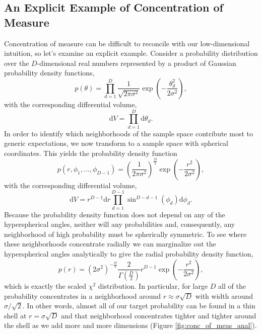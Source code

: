 \documentclass[11pt, oneside]{article}
\newcommand{\dd}{ \mathrm{d} }
\begin{document}
\subsection{An Explicit Example of Concentration of Measure}

Concentration of measure can be difficult to reconcile with our
low-dimensional intuition, so let's examine an explicit example.  Consider 
a probability distribution over the $D$-dimensional real numbers 
represented by a product of Gaussian probability density functions,
%
\begin{equation*}
p \! \left( \theta \right) = 
\prod_{d = 1}^{D} \frac{1}{\sqrt{2 \pi \sigma^{2} } }
\exp \! \left( - \frac{\theta_{d}^{2}}{2 \sigma^{2}} \right),
\end{equation*}
%
with the corresponding differential volume,
%
\begin{equation*}
\dd V = \prod_{d = 1}^{D} \dd \theta_{d}.
\end{equation*}
%
In order to identify which neighborhoods of the sample space contribute
most to generic expectations, we now transform to a sample space with 
spherical coordinates.  This yields the probability density function
%
\begin{equation*}
p \! \left( r, \phi_{1}, \ldots, \phi_{D - 1} \right) = 
\left( \frac{1}{2 \pi \sigma^{2} } \right)^{\frac{D}{2}}
\exp \! \left( - \frac{r^{2}}{2 \sigma^{2}} \right),
\end{equation*}
%
with the corresponding differential volume,
%
\begin{equation*}
\dd V = 
r^{D - 1} \dd r 
\prod_{d = 1}^{D - 1} \sin^{D - d - 1} \! \left( \phi_{d} \right) \dd \phi_{d}.
\end{equation*}
%
Because the probability density function does not depend on
any of the hyperspherical angles, neither will any probabilities
and, consequently, any neighborhood of high probability must be
spherically symmetric.  To see where these neighborhoods concentrate
radially we can marginalize out the hyperspherical angles analytically
to give the radial probability density function,
%
\begin{equation*}
p \! \left( r \right) = 
\left( 2 \sigma^{2} \right)^{-\frac{D}{2} }
\frac{ 2 }{ \Gamma \! \left( \frac{D}{2} \right) }
r^{D - 1} \exp \! \left( - \frac{r^{2}}{2 \sigma^{2}} \right),
\end{equation*}
%
which is exactly the scaled $\chi^2$ distribution.  In particular, for
large $D$ all of the probability concentrates in a neighborhood
around $r \approx \sigma \sqrt{D}$ with width around $\sigma / \sqrt{2}$.  
In other words, almost all of our target probability can be found in a 
thin shell at $r = \sigma \sqrt{D}$ and that neighborhood concentrates 
tighter and tighter around the shell as we add more and more dimensions 
(Figure \ref{fig:conc_of_meas_anal}).
\end{document}
